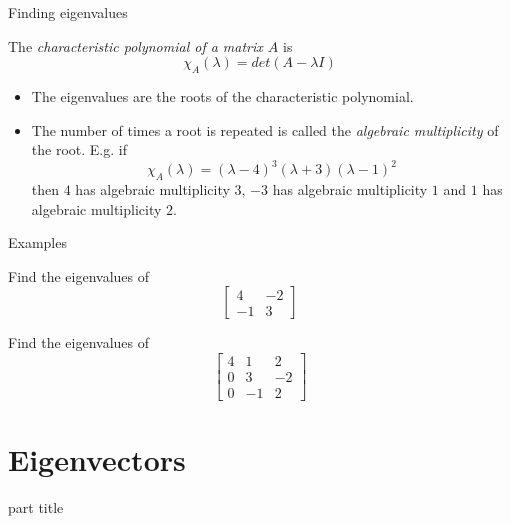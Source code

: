 \documentclass{beamer}
\begin{document}
\begin{frame}{Finding eigenvalues}
\begin{definition}
	The \emph{characteristic polynomial of a matrix $A$} is
	\begin{equation*}
	 	\chi_A(\lambda) = det(A-\lambda I)
	 \end{equation*} 
\end{definition}
\begin{itemize}
	\item The eigenvalues are the roots of the characteristic polynomial.
	\item The number of times a root is repeated is called the \emph{algebraic multiplicity} of the root.
	E.g. if
	\begin{equation*}
		\chi_A(\lambda) = (\lambda-4)^3(\lambda+3)(\lambda-1)^2
	\end{equation*}
	then $4$ has algebraic multiplicity $3$, $-3$ has algebraic multiplicity $1$ and $1$ has algebraic multiplicity $2$.
\end{itemize}
\end{frame}

\begin{frame}{Examples}
\begin{example}
	Find the eigenvalues of
	\begin{equation*}
		\left[
		\begin{matrix}
		4&-2\\
		-1&3
		\end{matrix}
		\right]
	\end{equation*}
\end{example}
\begin{example}
	Find the eigenvalues of
	\begin{equation*}
		\left[
		\begin{matrix}
		4&1&2\\
		0&3&-2\\
		0&-1&2
		\end{matrix}
		\right]
	\end{equation*}
\end{example}
\end{frame}

\section{Eigenvectors}

\begin{frame}
\begin{beamercolorbox}[sep=12pt,center]{part title}
\insertsection\par
\end{beamercolorbox}
\end{frame}
\end{document}
